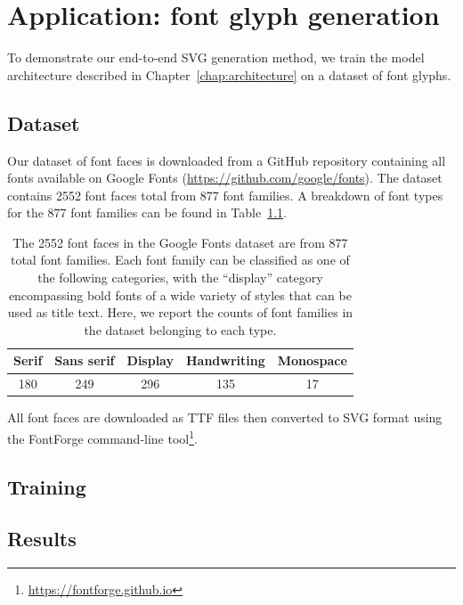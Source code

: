 \chapter{Application: font glyph generation}\label{chap:training}
To demonstrate our end-to-end SVG generation method, we train the model architecture described in Chapter~\ref{chap:architecture} on a dataset of font glyphs.

\section{Dataset}\label{sec:font-data}
Our dataset of font faces is downloaded from a GitHub repository containing all fonts available on Google Fonts (\url{https://github.com/google/fonts}).
The dataset contains 2552 font faces total from 877 font families.
A breakdown of font types for the 877 font families can be found in Table~\ref{tbl:fonttypes}.

\begin{table}[h]
\centering
\caption[A breakdown of font types in the Google Fonts dataset]
    {The 2552 font faces in the Google Fonts dataset are from 877 total font families.
    Each font family can be classified as one of the following categories, with the ``display'' category encompassing bold fonts of a wide variety of styles that can be used as title text.
    Here, we report the counts of font families in the dataset belonging to each type.\label{tbl:fonttypes}}
\begin{tabular}{c c c c c}
\toprule
    Serif & Sans serif & Display & Handwriting & Monospace \\ \midrule
    180 & 249 & 296 & 135 & 17
\end{tabular}
\end{table}

All font faces are downloaded as TTF files then converted to SVG format using the FontForge command-line tool\footnote{\url{https://fontforge.github.io}}.

\section{Training}
\section{Results}
